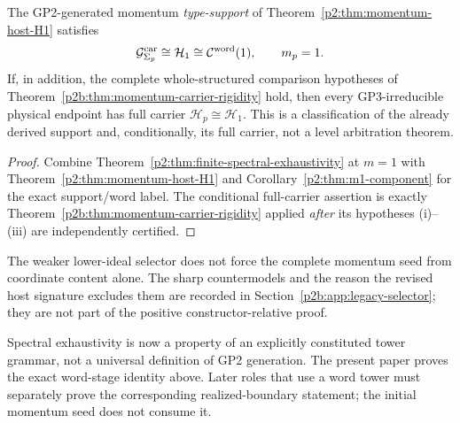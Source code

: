 \documentclass[11pt,a4paper]{article}
\begin{document}
\begin{theorem}
\label{p2:thm:spex-fit-level-one}
The GP2-generated momentum \emph{type-support} of
Theorem~\ref{p2:thm:momentum-host-H1} satisfies
\[
 \mathcal G^{\rm car}_{\Sigma_p}
 \cong\mathcal H_1\cong\mathcal C^{\rm word}(1),
 \qquad m_p=1.
\]
If, in addition, the complete whole-structured comparison hypotheses
of Theorem~\ref{p2b:thm:momentum-carrier-rigidity} hold,
then every GP3-irreducible physical endpoint has full carrier
\(\mathcal H_p\cong\mathcal H_1\).  This is a classification of the
already derived support and, conditionally, its full carrier, not a level
arbitration theorem.
\end{theorem}

\begin{proof}
Combine Theorem~\ref{p2:thm:finite-spectral-exhaustivity} at \(m=1\) with
Theorem~\ref{p2:thm:momentum-host-H1} and
Corollary~\ref{p2:thm:m1-component} for the exact support/word label.
The conditional full-carrier assertion is exactly
Theorem~\ref{p2b:thm:momentum-carrier-rigidity} applied \emph{after}
its hypotheses (i)--(iii) are independently certified.
\end{proof}

\begin{remark}
\label{p2:rem:why-coordinate-hypothesis}
The weaker lower-ideal selector does not force the complete momentum
seed from coordinate content alone.  The sharp countermodels and the reason
the revised host signature excludes them are recorded in
Section~\ref{p2b:app:legacy-selector}; they are not part of the positive
constructor-relative proof.
\end{remark}

\begin{remark}
\label{p2:rem:spex-proof-status}
Spectral exhaustivity is now a property of an explicitly constituted tower
grammar, not a universal definition of GP2 generation.  The present paper
proves the exact word-stage identity above.  Later roles that use a word tower
must separately prove the corresponding realized-boundary statement; the
initial momentum seed does not consume it.
\end{remark}
\end{document}
